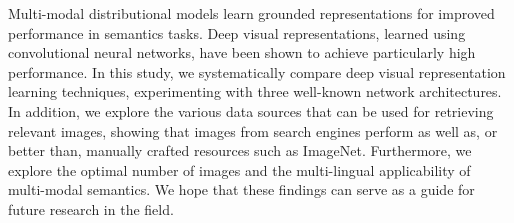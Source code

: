 Multi-modal distributional models learn grounded representations for improved performance in semantics tasks. Deep visual representations, learned using convolutional neural networks, have been shown to achieve particularly high performance. In this study, we systematically compare deep visual representation learning techniques, experimenting with three well-known network architectures. In addition, we explore the various data sources that can be used for retrieving relevant images, showing that images from search engines perform as well as, or better than, manually crafted resources such as ImageNet. Furthermore, we explore the optimal number of images and the multi-lingual applicability of multi-modal semantics. We hope that these findings can serve as a guide for future research in the field.

